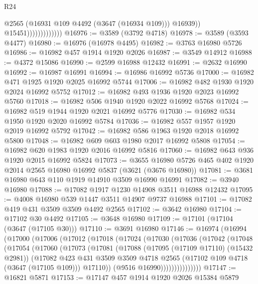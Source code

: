 \begin{lexlean}{R24}
\begin{coremodule}
                                  @2565
                                  (@16931 @109 @4492 (@3647 (@16934 @109)))
                                  @16939))
                              @15451)))))))))))))
@16976 := @3589 (@3792 @4718)
@16978 := @3589 (@3593 @4477)
@16980 := @16976 (@16978 @4495)
@16982 := @3763 @16980 @5726
@16986 := @16982 @457 @1914 @1920 @2026
@16987 := @3549 @14912
@16988 := @4372 @15086
@16990 := @2599 @16988 @12432
@16991 := @2632 @16990
@16992 := @16987 @16991
@16994 := @16986 @16992 @5736
@17000 := @16982 @471 @1925 @1920 @2025 @16992 @5744
@17006 := @16982 @482 @1930 @1920 @2024 @16992 @5752
@17012 := @16982 @493 @1936 @1920 @2023 @16992 @5760
@17018 := @16982 @506 @1940 @1920 @2022 @16992 @5768
@17024 := @16982 @519 @1944 @1920 @2021 @16992 @5776
@17030 := @16982 @534 @1950 @1920 @2020 @16992 @5784
@17036 := @16982 @557 @1957 @1920 @2019 @16992 @5792
@17042 := @16982 @586 @1963 @1920 @2018 @16992 @5800
@17048 := @16982 @609 @603 @1980 @2017 @16992 @5808
@17054 := @16982 @620 @1983 @1920 @2016 @16992 @5816
@17060 := @16982 @643 @936 @1920 @2015 @16992 @5824
@17073 := @3655 @16980 @5726 @465 @402 @1920 @2014 @2565 @16980 @16992 @5837 (@3621 (@3676 @16980))
@17081 := @3681 @16980 @643 @110 @1919 @14910 @3509 @16990 @16991
@17082 := @3940 @16980
@17088 := @17082 @1917 @1230 @14908 @3511 @16988 @12432
@17095 := @4008 @16980 @539 @1447 @3511 @14907 @9737 @16988
@17101 := @17082 @419 @431 @3509 @3509 @4492 @2565
@17102 := @3642 @16980
@17104 := @17102 @30 @4492
@17105 := @3648 @16980
@17109 := @17101 (@17104 (@3647 (@17105 @30)))
@17110 := @3691 @16980
@17146 := @16974
    (@16994
      (@17000
        (@17006
          (@17012
            (@17018
              (@17024
                (@17030
                  (@17036
                    (@17042
                      (@17048
                        (@17054
                          (@17060
                            (@17073
                              (@17081
                                (@17088
                                  (@17095 (@17109 @17110) (@15432 @2981))
                                  (@17082
                                    @423
                                    @431
                                    @3509
                                    @3509
                                    @4718
                                    @2565
                                    (@17102 @109 @4718 (@3647 (@17105 @109)))
                                    @17110))
                                (@9516 @16990)))))))))))))))
@17147 := @16821 @5871
@17153 := @17147 @457 @1914 @1920 @2026 @15384 @5879

\end{coremodule}
\end{lexlean}
